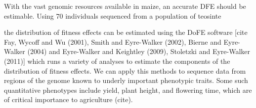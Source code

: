 With the vast genomic resources available in maize, an accurate DFE should be estimable. Using 70 individuals sequenced from a population of teosinte 






	

 the distribution of fitness effects can be estimated using the DoFE software [cite Fay, Wycoff and Wu (2001), Smith and Eyre-Walker (2002), Bierne and Eyre-Walker (2004) and Eyre-Walker and Keightley (2009), Stoletzki and Eyre-Walker (2011)] which runs a variety of analyses to estimate the components of the distribution of fitness effects. We can apply this methods to sequence data from regions of the genome known to underly important phenotypic traits. Some such quantitative phenotypes include yield, plant height, and flowering time, which are of critical importance to agriculture (cite).

